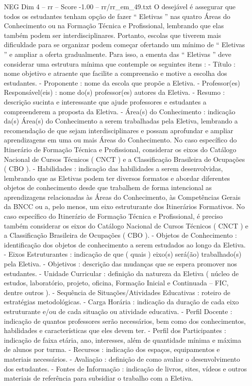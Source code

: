 \begin{textsample}{NEG Dim 4 – rr – Score -1.00 – rr/rr\_em\_49.txt}
O desejável é assegurar que todos os estudantes tenham opção de fazer “ Eletivas ” nas quatro Áreas do Conhecimento ou na Formação Técnica e Profissional, lembrando que elas também podem ser interdisciplinares.
Portanto, escolas que tiverem mais dificuldade para se organizar podem começar ofertando um mínimo de “ Eletivas ” e ampliar a oferta gradualmente.
Para isso, a ementa das “ Eletivas ” deve considerar uma estrutura mínima que contemple os seguintes itens : - Título : nome objetivo e atraente que facilite a compreensão e motive a escolha dos estudantes. - Proponente : nome da escola que propõe a Eletiva. - Professor(es) Responsável(eis) : nome do(s) professor(es) autores da Eletiva. - Resumo : descrição sucinta e interessante que ajude professores e estudantes a compreenderem a proposta da Eletiva. - Área(s) do Conhecimento : indicação da(s) Área(s) do Conhecimento a serem trabalhadas pela Eletiva, lembrando a recomendação de que sejam interdisciplinares e possam aprofundar e ampliar aprendizagens em uma ou mais Áreas do Conhecimento.
No caso específico do Itinerário de Formação Técnica e Profissional, considerar os eixos do Catálogo Nacional de Cursos Técnicos ( CNCT ) e a Classificação Brasileira de Ocupações ( CBO ). - Habilidades : indicação das habilidades a serem desenvolvidas, lembrando que as Eletivas podem ter diversos formatos e abordar diferentes objetos de conhecimento desde que trabalhem de forma intencional as aprendizagens relacionadas às Áreas do Conhecimento, às Competências Gerais da BNCC ou a, pelo menos, um eixo estruturante dos Itinerários Formativos.
No caso específico do Itinerário de Formação Técnica e Profissional, é preciso também considerar os eixos do Catálogo Nacional de Cursos Técnicos ( CNCT ) e a Classificação Brasileira de Ocupações ( CBO ). - Objetos de Conhecimento : identificação dos objetos de conhecimento a serem estudados ao longo da Eletiva. - Eixos Estruturantes : indicação de que ( quais ) eixo(s) será(ão) trabalhado(s) pela Eletiva. - Objetivos : descrição das mudanças que se espera promover nos estudantes. - Unidade Curricular : definição da natureza da Eletiva ( núcleo de estudos, laboratório, projeto, oficina, Formação Inicial e Continuada – FIC, dentre outros ). - Sequência de Situações/Atividades Educativas : roteiro de estratégias metodológicas. - Carga Horária : indicação da duração de cada eixo estruturante e/ou de cada situação ou atividade educativa. - Perfil Docente : indicação de quantos professores serão necessários, bem como dos conhecimentos, habilidades e características que eles devem ter. - Perfil dos Participantes : indicação de faixa etária, ano, interesses, além de quantidade mínima e máxima de alunos por turma. - Recursos : indicação dos espaços, equipamentos e materiais necessários. - Avaliação : definição de como avaliar o desenvolvimento dos estudantes. - Fontes de Informação : indicação de livros, sites, vídeos e outros materiais de referência para subsidiar o trabalho com a Eletiva.

\end{textsample}
